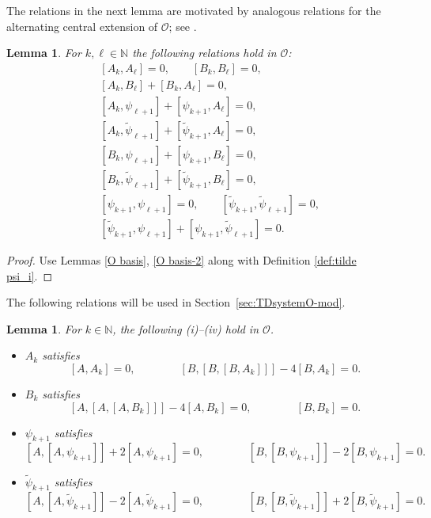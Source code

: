 \documentclass[11pt]{article}%
\theoremstyle{definition}
\theoremstyle{plain}
\newtheorem{lemma}[definition]{Lemma}
\begin{document}
The relations in the next lemma are motivated by analogous relations for the alternating central extension of $\mathcal{O}$; see \cite[Lemma~4.24]{2023TerCAlg}.

\begin{lemma}\label{lem:rels in O}
For $k, \ell \in \mathbb{N}$ the following relations hold in $\mathcal{O}$:
\begin{align*}
	& [A_k, A_\ell] = 0, \qquad [B_k, B_\ell] = 0, \\
	& [A_k, B_\ell] + [B_k, A_\ell] = 0, \\
	& [A_k, \psi_{\ell+1}] + [\psi_{k+1}, A_\ell] = 0, \\
	& [A_k, \tilde\psi_{\ell+1}] + [\tilde\psi_{k+1}, A_\ell] = 0, \\
	& [B_k, \psi_{\ell+1}] + [\psi_{k+1}, B_\ell] = 0, \\
	& [B_k, \tilde\psi_{\ell+1}] + [\tilde\psi_{k+1}, B_\ell] = 0, \\
	& [\psi_{k+1}, \psi_{\ell+1}] = 0, \qquad [\tilde\psi_{k+1}, \tilde\psi_{\ell+1}] = 0, \\
	& [\tilde\psi_{k+1}, \psi_{\ell+1}] + [\psi_{k+1}, \tilde\psi_{\ell+1}] = 0.
\end{align*}
\end{lemma}
\begin{proof}
Use Lemmas \ref{O basis}, \ref{O basis-2} along with Definition \ref{def:tilde psi_i}.
\end{proof}


The following relations will be used in Section~\ref{sec:TDsystemO-mod}.
\begin{lemma}\label{lem:some rels A,B}
For $k \in \mathbb{N}$, the following {\rm(i)}--{\rm(iv)} hold in $\mathcal{O}$.
\begin{itemize}
	\item[\rm(i)] $A_k$ satisfies
	$$
		[A, A_k] = 0, \qquad \qquad [B, [B, [B, A_k]]] - 4[B, A_k] = 0.
	$$
	\item[\rm(ii)] $B_k$ satisfies
	$$
		[A, [A, [A, B_k]]] - 4[A, B_k] = 0, \qquad \qquad [B, B_k] = 0.
	$$
	\item[\rm(iii)] $\psi_{k+1}$ satisfies
	$$
		[A, [A, \psi_{k+1}]] + 2[A, \psi_{k+1}] = 0, \qquad \qquad 
		[B, [B, \psi_{k+1}]] - 2[B, \psi_{k+1}] = 0.
	$$
	\item[\rm(iv)] $\tilde\psi_{k+1}$ satisfies
	$$
		[A, [A, \tilde\psi_{k+1}]] - 2[A, \tilde\psi_{k+1}] = 0, \qquad \qquad 
		[B, [B, \tilde\psi_{k+1}]] + 2[B, \tilde\psi_{k+1}] = 0.
	$$
\end{itemize}
\end{lemma}
\end{document}
